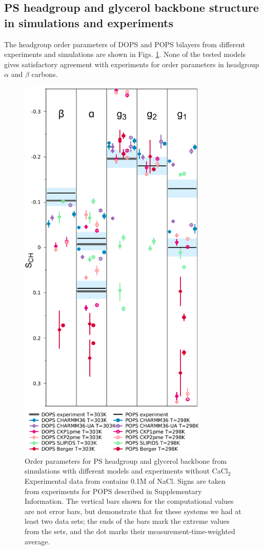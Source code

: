 \documentclass[aps,prl,superscriptaddress,twocolumn]{revtex4}
\begin{document}
\subsection{PS headgroup and glycerol backbone structure in simulations and experiments}
The headgroup order parameters of DOPS and POPS bilayers 
from different experiments and simulations are shown in
Figs. \ref{HGorderParametersPS}.
None of the tested models gives satisfactory agreement with
experiments for order parameters in headgroup $\alpha$ and $\beta$
carbons.
\begin{figure}[]
  \centering
  \includegraphics[width=9.0cm]{../Figs/HGorderparametersPS.pdf}
  \caption{\label{HGorderParametersPS}
    Order parameters for PS headgroup and glycerol
    backbone from simulations with different models and experiments without CaCl$_2$ 
    Experimental data from \cite{browning80} contains 0.1M of NaCl.
    Signs are taken from experiments for POPS described in Supplementary Information.
    The vertical bars shown for the computational values are not error bars, but demonstrate that for these systems we had at least two data sets; the ends of the bars mark the extreme values from the sets, and the dot marks their measurement-time-weighted average.
  }
\end{figure}
\end{document}
